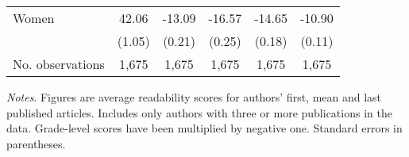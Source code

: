 \begin{table}[H]
\begin{threeparttable}
\begin{tabular}{p{3cm}S@{}S@{}S@{}S@{}S@{}}
            \quad Women                   &       42.06&      -13.09&      -16.57&      -14.65&      -10.90\\
                                          &      (1.05)&      (0.21)&      (0.25)&      (0.18)&      (0.11)\\
            \midrule
            No. observations              &       1,675&       1,675&       1,675&       1,675&       1,675\\
            \bottomrule
        \end{tabular}
        \begin{tablenotes}
            \tiny
            \item \textit{Notes}. Figures are average readability scores for authors' first, mean and last published articles. Includes only authors with three or more publications in the data. Grade-level scores have been multiplied by negative one. Standard errors in parentheses.
        \end{tablenotes}
    \end{threeparttable}
\end{table}